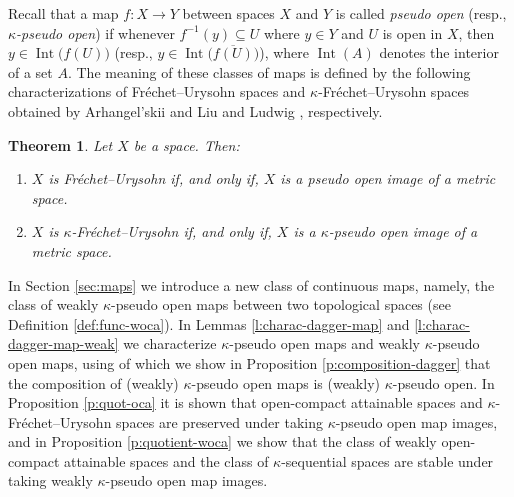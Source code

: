 \documentclass[preprint,11pt]{elsarticle}
\def\Int{\operatorname{Int}}
\newtheorem{theorem}{Theorem}[section]
\numberwithin{equation}{section}
\numberwithin{theorem}{section}
\begin{document}
Recall that a map $f:X\to Y$ between spaces $X$ and $Y$ is called {\em pseudo open} (resp., {\em $\kappa$-pseudo open}) if whenever $f^{-1}(y)\subseteq U$ where $y\in Y$ and $U$ is open in $X$, then $y\in \Int\big(f(U)\big)$ (resp., $y\in \Int\big(\overline{f(U)}\big)$), where $\Int(A)$ denotes the interior of a set $A$. The meaning of these classes of maps is defined by the following characterizations of Fr\'{e}chet--Urysohn spaces and $\kappa$-Fr\'{e}chet--Urysohn spaces obtained by Arhangel'skii \cite{Arhan63} and Liu and Ludwig \cite{LiL}, respectively.
\begin{theorem} \label{t:FU-kFU}
Let $X$ be a space. Then:
\begin{enumerate}
\item[{\rm(i)}] $X$ is Fr\'{e}chet--Urysohn if, and only if, $X$ is a pseudo open image of a metric space.
\item[{\rm(ii)}] $X$ is  $\kappa$-Fr\'{e}chet--Urysohn if, and only if, $X$ is a $\kappa$-pseudo open image of a metric space.
\end{enumerate}
\end{theorem}



In Section \ref{sec:maps}
we introduce a new class of continuous maps, namely, the class of weakly $\kappa$-pseudo open maps between two topological spaces (see Definition \ref{def:func-woca}). In Lemmas \ref{l:charac-dagger-map} and \ref{l:charac-dagger-map-weak} we characterize $\kappa$-pseudo open maps  and weakly $\kappa$-pseudo open maps, using of which we show in Proposition \ref{p:composition-dagger} that the composition of (weakly) $\kappa$-pseudo open maps is (weakly) $\kappa$-pseudo open. In Proposition \ref{p:quot-oca} it is shown that open-compact attainable spaces and $\kappa$-Fr\'{e}chet--Urysohn spaces are preserved under taking  $\kappa$-pseudo open map images, and in Proposition \ref{p:quotient-woca} we show that the class of weakly open-compact attainable spaces and the class of $\kappa$-sequential spaces are stable under taking  weakly  $\kappa$-pseudo open map images.
\smallskip
\end{document}

